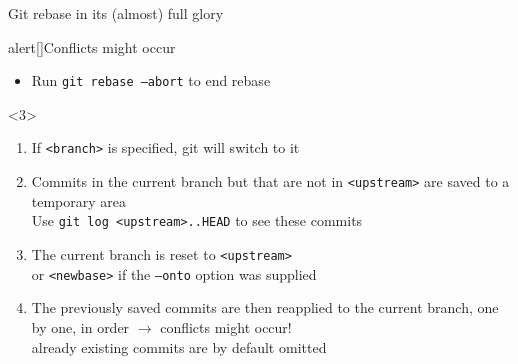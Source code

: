 \documentclass[usenames,svgnames,14pt]{beamer}
\newcommand{\then}{\raisebox{2pt}{$\;\drsh\;$}}
\begin{document}
\begin{frame}[fragile]{Git rebase in its (almost) full glory}
\begin{overlayarea}{\textwidth}{0.5\textheight}
\begin{onlyenv}
\begin{varblock*}{alert}[\textwidth]{Conflicts might occur}
\begin{overlayarea}{\textwidth}{0.12\textheight}
\begin{onlyenv}
\begin{itemize}
                            \item Run \;\texttt{git rebase --abort} to end rebase
                        \end{itemize}
                    \end{onlyenv}
                \end{overlayarea}
            \end{varblock*}
        \end{onlyenv}
        \begin{onlyenv}<3>
            \newcommand{\opt}[1]{\;\textcolor{environment-color}{\texttt{#1}}\;}
            \begin{enumerate}
                \item If \opt{<branch>} is specified, git will switch to it%
                \item Commits in the current branch but that are not in \opt{<upstream>} are saved to a temporary area\\
                      {\footnotesize\then Use \;\texttt{git log <upstream>..HEAD}\; to see these commits}
                \item The current branch is reset to \opt{<upstream>}\\
                      {\footnotesize\then or \opt{<newbase>} if the \opt{--onto} option was supplied}
                \item The previously saved commits are then reapplied to the current branch, one by one, in order
                      $\to$ \alert{conflicts might occur!}\\
                      {\footnotesize\then already existing commits are by default omitted}
            \end{enumerate}
        \end{onlyenv}
    \end{overlayarea}
\end{frame}
\end{document}

